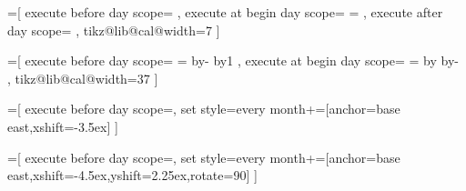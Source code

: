 %
%

=[%
  execute before day scope={%
  }, 
  execute at begin day scope={%
    \pgfmathsetlength\pgf@x{\tikz@lib@cal@xshift}%
    \pgf@x=\pgfcalendarcurrentweekday\pgf@x%
    \pgftransformxshift{\pgf@x}%
  },
  execute after day scope={%
  },
  tikz@lib@cal@width=7
]



%
%

=[%
  execute before day scope={%
    {%
      \edef\tikz@lib@cal@month@list@start{\pgfcalendarcurrentweekday}%
    }{}%
    {%
      {%
        \c@pgf@counta=\pgfcalendarcurrentjulian%
        \advance\c@pgf@counta by-\pgfcalendarcurrentday%
        \advance\c@pgf@counta by1\relax%
        \pgfcalendarjuliantoweekday{\c@pgf@counta}{\c@pgf@countb}%
        \xdef\pgf@temp{\the\c@pgf@countb}%
      }%
      \let\tikz@lib@cal@month@list@start=\pgf@temp%
    }{}%
  }, 
  execute at begin day scope={%
    \pgfmathsetlength\pgf@xa{\tikz@lib@cal@xshift}%
    \pgf@xb=\pgfcalendarcurrentday\pgf@xa%
    \advance\pgf@xb by\tikz@lib@cal@month@list@start\pgf@xa%
    \advance\pgf@xb by-\pgf@xa\relax%
    \pgftransformxshift{\pgf@xb}%
  },
  tikz@lib@cal@width=37
]




%
%

=[%
  execute before day scope={},
  set style={{every month}+=[anchor=base east,xshift=-3.5ex]}
]

=[%
  execute before day scope={},
  set style={{every month}+=[anchor=base east,xshift=-4.5ex,yshift=2.25ex,rotate=90]}
]
  
